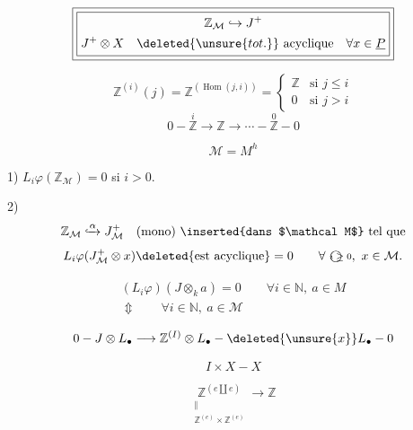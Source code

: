 \[
\boxed{\boxed{\begin{gathered}
\mathbb Z_{\mathcal M}\hookrightarrow J^+\\
J^+\otimes X\quad\deleted{\unsure{tot.}}\ \text{acyclique}\quad
\forall x\in\underline P
\end{gathered}}}
\]


\[
\mathbb Z^{(i)}(j)=\mathbb Z^{(\operatorname{Hom}(j,i))}
=\begin{cases}\mathbb Z&\text{si }j\leq i\\0&\text{si }j>i\end{cases}
\]
\[
0\mathbin{-}\overset{i}{\mathbb Z}\longrightarrow\mathbb Z\longrightarrow\cdots
\mathbin{-}\overset{0}{\mathbb Z}\mathbin{-}0
\]



\[
\mathcal M=M^h
\]

1) $L_i\varphi(\mathbb Z_{\mathcal M})=0$ si $i>0$.

2) 
\[
\mathbb Z_{\mathcal M}\lhook\joinrel\xrightarrow{\alpha}J_{\mathcal M}^+
\quad\text{(mono) \inserted{dans $\mathcal M$} tel que}
\]
\[
L_i\varphi(J_{\mathcal M}^+\otimes x)\deleted{\text{est acyclique}}=0
\qquad\forall\ \text{\textcircled{\scriptsize$i\geq0$}},\ x\in\mathcal M.
\]

\[
\begin{gathered}
(L_i\varphi)(J\otimes_k a)=0\qquad\forall i\in\mathbb N,\ a\in M\\
\Updownarrow\qquad\forall i\in\mathbb N,\ a\in\mathcal M
\end{gathered}
\]

\[
0\mathbin{-}J\otimes L_\bullet\longrightarrow\mathbb Z^{(I)}\otimes L_\bullet
\mathbin{-}\deleted{\unsure{x}}L_\bullet\mathbin{-}0
\]


\[
I\times X\mathbin{-}X
\]

\[
\underset{\begin{smallmatrix}\Vert\\\mathbb Z^{(e)}\times\mathbb Z^{(e)}\end{smallmatrix}}
{\mathbb Z^{(e\amalg e)}}\longrightarrow\mathbb Z
\]

